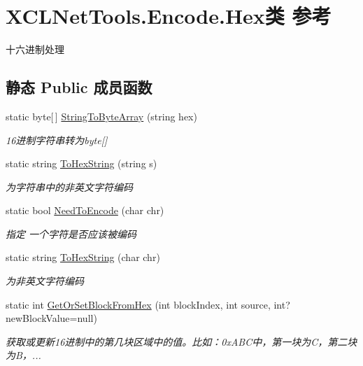 \hypertarget{class_x_c_l_net_tools_1_1_encode_1_1_hex}{\section{X\-C\-L\-Net\-Tools.\-Encode.\-Hex类 参考}
\label{class_x_c_l_net_tools_1_1_encode_1_1_hex}
}


十六进制处理  


\subsection*{静态 Public 成员函数}
\begin{DoxyCompactItemize}
\item 
static byte\mbox{[}$\,$\mbox{]} \hyperlink{class_x_c_l_net_tools_1_1_encode_1_1_hex_a0fb06fdeea06d52883d1f1a93bfcf4e8}{String\-To\-Byte\-Array} (string hex)
\begin{DoxyCompactList}\small\item\em 16进制字符串转为byte\mbox{[}\mbox{]} \end{DoxyCompactList}\item 
static string \hyperlink{class_x_c_l_net_tools_1_1_encode_1_1_hex_a60f888006a88a296a97f8212abd0ddba}{To\-Hex\-String} (string s)
\begin{DoxyCompactList}\small\item\em 为字符串中的非英文字符编码 \end{DoxyCompactList}\item 
static bool \hyperlink{class_x_c_l_net_tools_1_1_encode_1_1_hex_aac3a2883c1182b43cdc0ebd7a5554895}{Need\-To\-Encode} (char chr)
\begin{DoxyCompactList}\small\item\em 指定 一个字符是否应该被编码 \end{DoxyCompactList}\item 
static string \hyperlink{class_x_c_l_net_tools_1_1_encode_1_1_hex_a58fb0c39fe4db08762c074d9d774729d}{To\-Hex\-String} (char chr)
\begin{DoxyCompactList}\small\item\em 为非英文字符编码 \end{DoxyCompactList}\item 
static int \hyperlink{class_x_c_l_net_tools_1_1_encode_1_1_hex_abe9191a3f762b84c077bba6ef4f6dc30}{Get\-Or\-Set\-Block\-From\-Hex} (int block\-Index, int source, int?new\-Block\-Value=null)
\begin{DoxyCompactList}\small\item\em 获取或更新16进制中的第几块区域中的值。比如：0x\-A\-B\-C中，第一块为\-C，第二块为\-B，... \end{DoxyCompactList}\end{DoxyCompactItemize}


